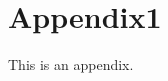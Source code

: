 \documentclass[./main]{subfiles}
\begin{document}
\section{Appendix1}
This is an appendix.

\end{document}
